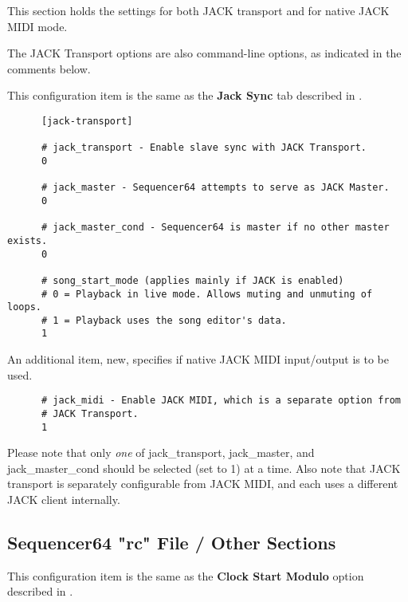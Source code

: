    This section holds the settings for both JACK transport and for native JACK
   MIDI mode.

   The JACK Transport options are also command-line options, as indicated in
   the comments below.

   This configuration item is the same as the 
   \textbf{Jack Sync} tab described in
   .

   \begin{verbatim}
      [jack-transport]

      # jack_transport - Enable slave sync with JACK Transport.
      0

      # jack_master - Sequencer64 attempts to serve as JACK Master.
      0

      # jack_master_cond - Sequencer64 is master if no other master exists.
      0

      # song_start_mode (applies mainly if JACK is enabled)
      # 0 = Playback in live mode. Allows muting and unmuting of loops.
      # 1 = Playback uses the song editor's data.
      1
   \end{verbatim}

   An additional item, new, specifies if native JACK MIDI input/output is to be
   used.

   \begin{verbatim}
      # jack_midi - Enable JACK MIDI, which is a separate option from
      # JACK Transport.
      1
   \end{verbatim}

   Please note that only \textsl{one} of
   jack\_transport, jack\_master, and jack\_master\_cond should be selected
   (set to 1) at a time.
   Also note that JACK transport is separately configurable from
   JACK MIDI, and each uses a different JACK client internally.

\subsection{Sequencer64 "rc" File / Other Sections}
\label{subsec:seq64_rc_file_other_midi}

   This configuration item is the same as the
   \textbf{Clock Start Modulo} option described in
   .

